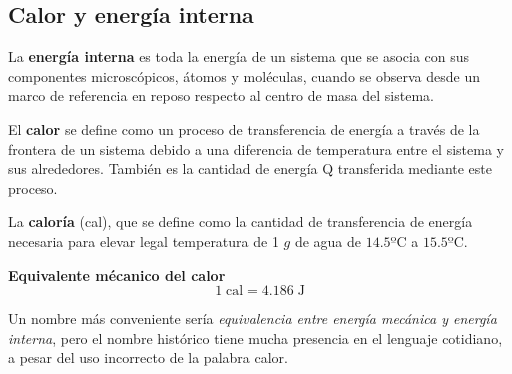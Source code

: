 \subsection{Calor y energía interna}
  \PN La \textbf{energía interna} es toda la energía de un sistema que se asocia con sus componentes microscópicos,
  átomos y moléculas, cuando se observa desde un marco de referencia en reposo respecto al centro de masa del sistema.

  \vspace{3mm}
  \PN El \textbf{calor} se define como un proceso de transferencia de energía a través de la frontera de un sistema
  debido a una diferencia de temperatura entre el sistema y sus alrededores. También es la cantidad de energía Q
  transferida mediante este proceso.

  \vspace{3mm}
  \PN La \textbf{caloría} (cal), que se define como la cantidad de transferencia de energía necesaria para elevar legal
  temperatura de 1 $g$ de agua de $14.5º$C a $15.5º$C.

  \vspace{3mm}
  \PN \textbf{Equivalente mécanico del calor}
  \begin{equation*}
    1 \; \text{cal} = 4.186 \; \text{J}
  \end{equation*}

  \PN Un nombre más conveniente sería \textit{equivalencia entre energía mecánica y energía interna}, pero el nombre
  histórico tiene mucha presencia en el lenguaje cotidiano, a pesar del uso incorrecto de la palabra calor.
